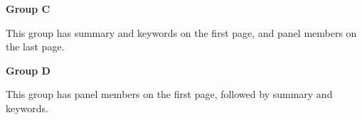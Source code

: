 \documentclass[12pt]{article}
\begin{document}
\textbf{Group C}

This group has summary and keywords on the first page, and panel members on the last page.


\textbf{Group D}

This group has panel members on the first page, followed by summary and keywords.

\end{document}
